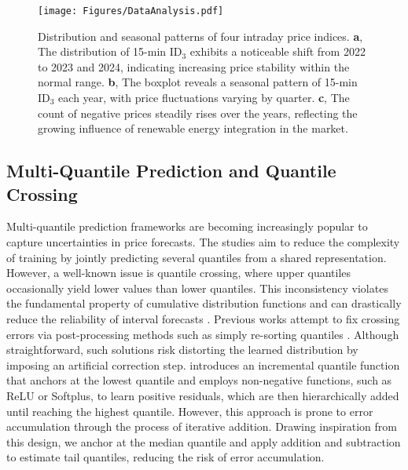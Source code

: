 \begin{figure*}[t]
\vskip 0.1in
\begin{center}
\centerline{\texttt{[image: Figures/DataAnalysis.pdf]}}
\caption{Distribution and seasonal patterns of four intraday price indices. 
\textbf{a}, The distribution of 15-min ID$_3$ exhibits a noticeable shift from 2022 to 2023 and 2024, indicating increasing price stability within the normal range.
\textbf{b}, The boxplot reveals a seasonal pattern of 15-min ID$_3$ each year, with price fluctuations varying by quarter.
\textbf{c}, The count of negative prices steadily rises over the years, reflecting the growing influence of renewable energy integration in the market.}
\label{datanalysis}
\end{center}
\vskip -0.3in
\end{figure*}

\subsection{Multi-Quantile Prediction and Quantile Crossing}

Multi-quantile prediction frameworks are becoming increasingly popular to capture uncertainties in price forecasts. The studies \cite{MultiQ, GQFormer} aim to reduce the complexity of training by jointly predicting several quantiles from a shared representation. However, a well-known issue is quantile crossing, where upper quantiles occasionally yield lower values than lower quantiles. This inconsistency violates the fundamental property of cumulative distribution functions and can drastically reduce the reliability of interval forecasts \cite{quantilecrossing}.
Previous works attempt to fix crossing errors via post-processing methods such as simply re-sorting quantiles \cite{sortquantilecrossing1, sortquantilecrossing2, Trading}.
Although straightforward, such solutions risk distorting the learned distribution by imposing an artificial correction step. 
\cite{LQF} introduces an incremental quantile function that anchors at the lowest quantile and employs non-negative functions, such as ReLU or Softplus, to learn positive residuals, which are then hierarchically added until reaching the highest quantile. However, this approach is prone to error accumulation through the process of iterative addition. Drawing inspiration from this design, we anchor at the median quantile and apply addition and subtraction to estimate tail quantiles,  reducing the risk of error accumulation.